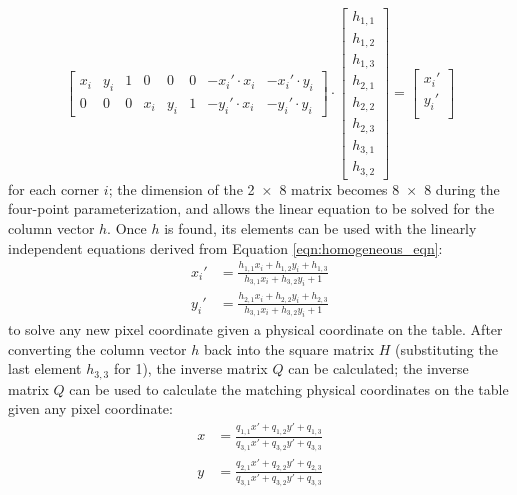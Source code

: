 \documentclass{article}
\begin{document}
          \begin{equation}
               \begin{bmatrix}
                    x_i & y_i & 1 & 0 & 0 & 0 & -x_i'\cdot x_i & -x_i'\cdot y_i \\
                    0 & 0 & 0 & x_i & y_i & 1 & -y_i'\cdot x_i & -y_i'\cdot y_i
               \end{bmatrix}
               \cdot
               \begin{bmatrix}
                    h_{1,1} \\ h_{1,2} \\ h_{1,3} \\
                    h_{2,1} \\ h_{2,2} \\ h_{2,3} \\
                    h_{3,1} \\ h_{3,2}
               \end{bmatrix}
               =
               \begin{bmatrix}
                    x_i'\\
                    y_i'\\
               \end{bmatrix}
          \label{eqn:homogeneous_eqn}
          \end{equation}
          for each corner $i$; the dimension of the \num{2x8} matrix becomes \num{8x8} during the four-point parameterization, and allows the linear equation to be solved for the column vector $h$. Once $h$ is found, its elements can be used with the linearly independent equations derived from Equation \ref{eqn:homogeneous_eqn}:
          \begin{align}
               x_i'&=\frac{h_{1,1}x_i+h_{1,2}y_i+h_{1,3}}{h_{3,1}x_i+h_{3,2}y_i+1}\\
               y_i'&=\frac{h_{2,1}x_i+h_{2,2}y_i+h_{2,3}}{h_{3,1}x_i+h_{3,2}y_i+1}
          \end{align}
          to solve any new pixel coordinate given a physical coordinate on the table\cite{GavaDfki,HomographyLab}. After converting the column vector $h$ back into the square matrix $H$ (substituting the last element $h_{3,3}$ for 1), the inverse matrix $Q$ can be calculated; the inverse matrix $Q$ can be used to calculate the matching physical coordinates on the table given any pixel coordinate:
          \begin{align}
               x &= \frac{q_{1,1}x'+q_{1,2}y'+q_{1,3}}{q_{3,1}x'+q_{3,2}y'+q_{3,3}}\\
               y &= \frac{q_{2,1}x'+q_{2,2}y'+q_{2,3}}{q_{3,1}x'+q_{3,2}y'+q_{3,3}}
          \label{eqn:inverse_eqn}
          \end{align}
\end{document}
